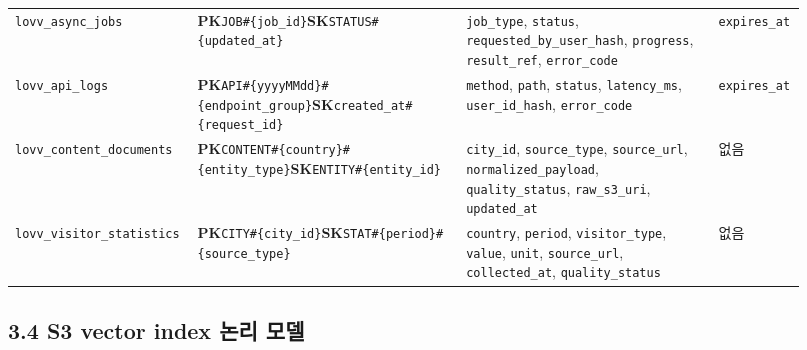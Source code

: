 \documentclass[12pt,a4paper]{article}
\newcommand{\DocNeedspace}[1]{\par\ifdim\dimexpr\pagegoal-\pagetotal\relax<#1\newpage\fi}
\renewcommand{\arraystretch}{1.35}
\begin{document}
\begin{scriptsize}
\begin{longtable}{@{}>{\centering\arraybackslash}m{0.178\linewidth}>{\RaggedRight\arraybackslash}m{0.332\linewidth}>{\RaggedRight\arraybackslash}m{0.315\linewidth}>{\centering\arraybackslash}m{0.095\linewidth}@{}}
\texttt{lovv\_\allowbreak{}async\_\allowbreak{}jobs} & \textbf{PK}\quad \texttt{JOB\#\{\allowbreak{}job\_\allowbreak{}id\}}\newline \textbf{SK}\quad \texttt{STATUS\#\{\allowbreak{}updated\_\allowbreak{}at\}} & \texttt{job\_\allowbreak{}type}, \texttt{status}, \texttt{requested\_\allowbreak{}by\_\allowbreak{}user\_\allowbreak{}hash}, \texttt{progress}, \texttt{result\_\allowbreak{}ref}, \texttt{error\_\allowbreak{}code} & \texttt{expires\_\allowbreak{}at} \\
\texttt{lovv\_\allowbreak{}api\_\allowbreak{}logs} & \textbf{PK}\quad \texttt{API\#\{\allowbreak{}yyyyMMdd\}\#\{\allowbreak{}endpoint\_\allowbreak{}group\}}\newline \textbf{SK}\quad \texttt{created\_\allowbreak{}at\#\{\allowbreak{}request\_\allowbreak{}id\}} & \texttt{method}, \texttt{path}, \texttt{status}, \texttt{latency\_\allowbreak{}ms}, \texttt{user\_\allowbreak{}id\_\allowbreak{}hash}, \texttt{error\_\allowbreak{}code} & \texttt{expires\_\allowbreak{}at} \\
\texttt{lovv\_\allowbreak{}content\_\allowbreak{}documents} & \textbf{PK}\quad \texttt{CONTENT\#\{\allowbreak{}country\}\#\{\allowbreak{}entity\_\allowbreak{}type\}}\newline \textbf{SK}\quad \texttt{ENTITY\#\{\allowbreak{}entity\_\allowbreak{}id\}} & \texttt{city\_\allowbreak{}id}, \texttt{source\_\allowbreak{}type}, \texttt{source\_\allowbreak{}url}, \texttt{normalized\_\allowbreak{}payload}, \texttt{quality\_\allowbreak{}status}, \texttt{raw\_\allowbreak{}s3\_\allowbreak{}uri}, \texttt{updated\_\allowbreak{}at} & 없음 \\
\texttt{lovv\_\allowbreak{}visitor\_\allowbreak{}statistics} & \textbf{PK}\quad \texttt{CITY\#\{\allowbreak{}city\_\allowbreak{}id\}}\newline \textbf{SK}\quad \texttt{STAT\#\{\allowbreak{}period\}\#\{\allowbreak{}source\_\allowbreak{}type\}} & \texttt{country}, \texttt{period}, \texttt{visitor\_\allowbreak{}type}, \texttt{value}, \texttt{unit}, \texttt{source\_\allowbreak{}url}, \texttt{collected\_\allowbreak{}at}, \texttt{quality\_\allowbreak{}status} & 없음 \\
\bottomrule
\end{longtable}
\renewcommand{\arraystretch}{1.35}
\end{scriptsize}


\newpage

\DocNeedspace{24\baselineskip}
\subsection*{3.4 S3 vector index 논리 모델}
\end{document}
